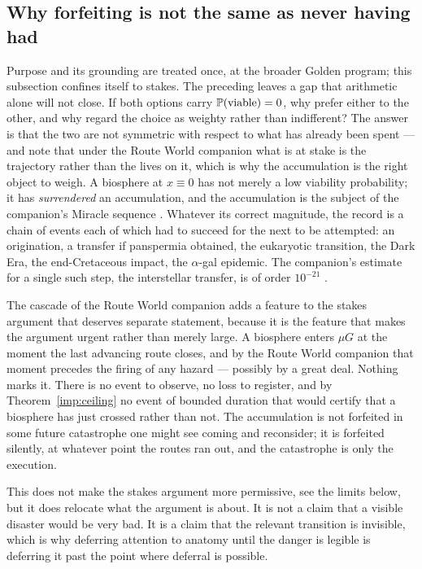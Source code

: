 \subsection{Why forfeiting is not the same as never having had}
\label{hr:subsub:stakes}

\noindent Purpose and its grounding are treated once, at
the broader Golden program; this subsection confines itself to stakes. The preceding leaves a gap that arithmetic alone will not close. If both
options carry $\mathbb{P}(\text{viable})=0$, why prefer either to the other,
and why regard the choice as weighty rather than indifferent? The answer is that the two are not symmetric with respect to what has
already been spent --- and note that under
the Route World companion \cite{GoldenRouteWorld} what is at stake is the trajectory
rather than the lives on it, which is why the accumulation is the right
object to weigh. A biosphere at $x\equiv0$ has not merely a low
viability probability; it has \emph{surrendered} an accumulation, and
the accumulation is the subject of the companion's Miracle sequence
\cite{Nexus}. Whatever its correct magnitude, the record is a chain of
events each of which had to succeed for the next to be attempted: an
origination, a transfer if panspermia obtained, the eukaryotic
transition, the Dark Era, the end-Cretaceous impact, the
$\alpha$-gal epidemic. The companion's estimate for a single such
step, the interstellar transfer, is of order $10^{-21}$
\cite{Nexus}.



\begin{remark}\label{hr:rem:silentforfeit}
The cascade of the Route World companion \cite{GoldenRouteWorld} adds a feature to the stakes
argument that deserves separate statement, because it is the feature
that makes the argument urgent rather than merely large. A biosphere enters $\mu G$ at the moment the last advancing route
closes, and by the Route World companion \cite{GoldenRouteWorld} that moment precedes the
firing of any hazard --- possibly by a great deal. Nothing marks it.
There is no event to observe, no loss to register, and by
Theorem~\ref{imp:ceiling} no event of bounded duration that would
certify that a biosphere has just crossed rather than not. The
accumulation is not forfeited in some future catastrophe one might see
coming and reconsider; it is forfeited silently, at whatever point the
routes ran out, and the catastrophe is only the execution.

This does not make the stakes argument more permissive, see the
limits below, but it does relocate what the argument is about. It is
not a claim that a visible disaster would be very bad. It is a claim
that the relevant transition is invisible, which is why deferring
attention to anatomy until the danger is legible is deferring it past
the point where deferral is possible.
\end{remark}

